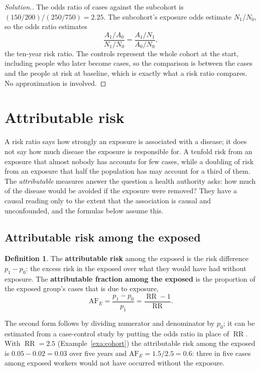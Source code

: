 \documentclass[11pt,a4paper]{article}
\numberwithin{equation}{section}
\DeclareMathOperator{\RR}{RR}
\theoremstyle{definition}
\newtheorem{defn}[thm]{Definition}
\newenvironment{solution}
  {\renewcommand{\qedsymbol}{}\begin{proof}[\textit{Solution}.]}
  {\end{proof}}
\begin{document}
\begin{solution}
The odds ratio of cases against the subcohort is $(150/200)/(250/750) = 2.25$. The subcohort's exposure odds estimate
$N_1/N_0$, so the odds ratio estimates
\[
\frac{A_1/A_0}{N_1/N_0} = \frac{A_1/N_1}{A_0/N_0} ,
\]
the ten-year risk ratio. The controls represent the whole cohort at the start, including people who later become cases, so the
comparison is between the cases and the people at risk at baseline, which is exactly what a risk ratio compares. No approximation is
involved.
\end{solution}

\section{Attributable risk}
\label{sec:attributable}

A risk ratio says how strongly an exposure is associated with a disease; it does not say how much disease the exposure is responsible
for. A tenfold risk from an exposure that almost nobody has accounts for few cases, while a doubling of risk from an exposure that half
the population has may account for a third of them. The \emph{attributable} measures answer the question a health authority asks: how
much of the disease would be avoided if the exposure were removed? They have a causal reading only to the extent that the association
is causal and unconfounded, and the formulas below assume this.

\subsection{Attributable risk among the exposed}

\begin{defn}
The \textbf{attributable risk} among the exposed is the risk difference $p_1 - p_0$: the excess risk in the exposed over what they would have
had without exposure. The \textbf{attributable fraction among the exposed} is the proportion of the exposed group's cases that is due to
exposure,
\[
\text{AF}_E = \frac{p_1 - p_0}{p_1} = \frac{\RR - 1}{\RR} .
\]
\end{defn}

The second form follows by dividing numerator and denominator by $p_0$; it can be estimated from a case-control study by putting the
odds ratio in place of $\RR$. With $\RR = 2.5$ (Example~\ref{exa:cohort}) the attributable risk among the exposed is $0.05 - 0.02 = 0.03$ over five
years and $\text{AF}_E = 1.5/2.5 = 0.6$: three in five cases among exposed workers would not have occurred without the exposure.
\end{document}
